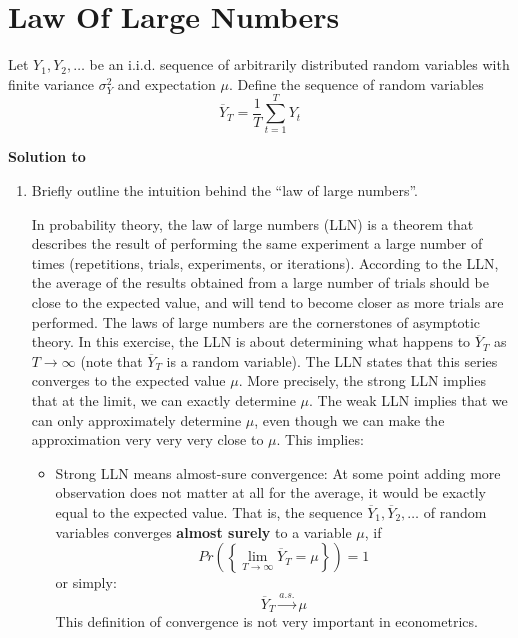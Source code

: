 \documentclass[a4paper]{scrartcl}
\begin{document}
\newpage

\section[Law Of Large Numbers]{Law Of Large Numbers}\label{ex:LLN}
Let $Y_{1},Y_{2},\ldots $ be an i.i.d. sequence of arbitrarily distributed random variables with finite variance $\sigma_Y ^{2}$ and expectation $\mu$. Define the sequence of
random variables
\begin{equation*}
\overline{Y}_{T}=\frac{1}{T}\sum_{t=1}^{T}Y_{t}
\end{equation*}
\begin{solution}\textbf{Solution to }\end{solution}
\begin{enumerate}
	\item Briefly outline the intuition behind the \enquote{law of large numbers}.
	\begin{solution}
		In probability theory, the law of large numbers (LLN) is a theorem that describes the result of performing the same experiment a large number of times (repetitions, trials, experiments, or iterations). According to the LLN, the average of the results obtained from a large number of trials should be close to the expected value, and will tend to become closer as more trials are performed. The laws of large numbers are the cornerstones of asymptotic theory. In this exercise, the LLN is about determining what happens to $\overline{Y}_T$ as $T\rightarrow\infty$ (note that $\overline{Y}_T$ is a random variable). The LLN states that this series converges to the expected value $\mu$. More precisely, the strong LLN implies that at the limit, we can exactly determine $\mu$. The weak LLN implies that we can only approximately determine $\mu$, even though we can make the approximation very very very close to $\mu$. This implies: 
		\begin{itemize}
			\item Strong LLN means almost-sure convergence: At some point adding more observation does not matter at all for the average, it would be exactly equal to the expected value. That is, the sequence $\overline{Y}_{1},\overline{Y}_{2},\ldots $ of random variables converges \textbf{almost surely} to a variable $\mu$, if
			\begin{equation*}
			Pr\left( \left\{ \lim_{T\rightarrow \infty }\overline{Y}_{T}=\mu\right\} \right) =1
			\end{equation*}
			or simply:
			\begin{equation*}
			\overline{Y}_{T}\overset{a.s.}{\rightarrow }\mu
			\end{equation*}
			This definition of convergence is not very important in econometrics.
			

\end{itemize}
\end{solution}
\end{enumerate}
\end{document}

